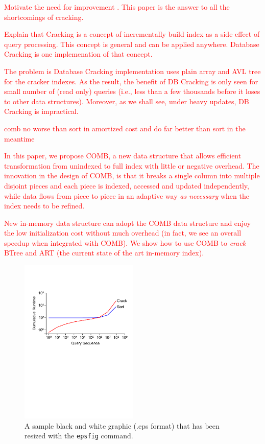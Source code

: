 \documentclass{sig-alternate}
\newcommand\todo[1]{\textcolor{red}{#1}}
\begin{document}
\todo{Motivate the need for improvement \cite{felix14uncracked}.
This paper is the answer to all the shortcomings of cracking.}

\todo{Explain that Cracking is a concept of incrementally build index
as a side effect of query processing.
This concept is general and can be applied anywhere.
Database Cracking is one implemenation of that concept.}

\todo{The problem is Database Cracking implementation uses plain array
and AVL tree for the cracker indexes.
As the result, the benefit of DB Cracking is only seen for small number of 
(read only) queries \cite{felix14uncracked}
(i.e., less than a few thousands before it loses to other data structures).
Moreover, as we shall see, under heavy updates, DB Cracking is impractical.}

\todo{comb no worse than sort in amortized cost and do far better than sort in the meantime}

\todo{In this paper, we propose COMB, a new data structure that allows
efficient transformation from unindexed to full index with little or negative overhead.
The innovation in the design of COMB, is that it breaks a single column into multiple
disjoint pieces and each piece is indexed, accessed and updated independently,
while data flows from piece to piece in an adaptive way {\em as necessary}
when the index needs to be refined.}

\todo{New in-memory data structure can adopt the COMB data structure
and enjoy the low initialization cost without much overhead
(in fact, we see an overall speedup when integrated with COMB).
We show how to use COMB to {\em crack} BTree and ART (the current state
of the art in-memory index).}

\begin{figure}
\centering
\includegraphics[width=0.5\textwidth]{crack_vs_sort.pdf}
\caption{A sample black and white graphic (.eps format)
that has been resized with the \texttt{epsfig} command.}
\end{figure}
\end{document}
